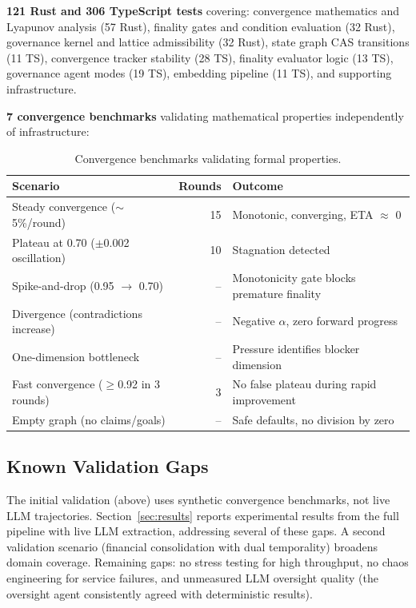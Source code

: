\documentclass[11pt]{article}
\begin{document}
\textbf{121 Rust and 306 TypeScript tests} covering: convergence mathematics and Lyapunov analysis (57 Rust), finality gates and condition evaluation (32 Rust), governance kernel and lattice admissibility (32 Rust), state graph CAS transitions (11 TS), convergence tracker stability (28 TS), finality evaluator logic (13 TS), governance agent modes (19 TS), embedding pipeline (11 TS), and supporting infrastructure.

\textbf{7 convergence benchmarks} validating mathematical properties independently of infrastructure:

\begin{table}[H]
\centering
\small
\begin{tabular}{lrl}
\toprule
\textbf{Scenario} & \textbf{Rounds} & \textbf{Outcome} \\
\midrule
Steady convergence ($\sim$5\%/round) & 15 & Monotonic, converging, ETA $\approx$ 0 \\
Plateau at 0.70 ($\pm$0.002 oscillation) & 10 & Stagnation detected \\
Spike-and-drop (0.95 $\rightarrow$ 0.70) & -- & Monotonicity gate blocks premature finality \\
Divergence (contradictions increase) & -- & Negative $\alpha$, zero forward progress \\
One-dimension bottleneck & -- & Pressure identifies blocker dimension \\
Fast convergence ($\geq$0.92 in 3 rounds) & 3 & No false plateau during rapid improvement \\
Empty graph (no claims/goals) & -- & Safe defaults, no division by zero \\
\bottomrule
\end{tabular}
\caption{Convergence benchmarks validating formal properties.}
\label{tab:benchmarks}
\end{table}

\subsection{Known Validation Gaps}

The initial validation (above) uses synthetic convergence benchmarks, not live LLM trajectories. Section~\ref{sec:results} reports experimental results from the full pipeline with live LLM extraction, addressing several of these gaps. A second validation scenario (financial consolidation with dual temporality) broadens domain coverage. Remaining gaps: no stress testing for high throughput, no chaos engineering for service failures, and unmeasured LLM oversight quality (the oversight agent consistently agreed with deterministic results).
\end{document}
